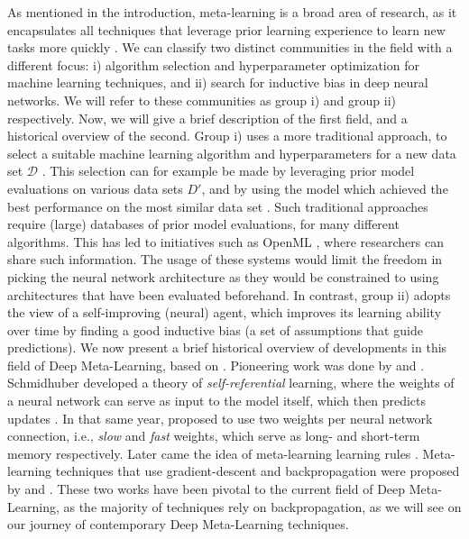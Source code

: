 As mentioned in the introduction, meta-learning is a broad area of research, as it encapsulates all techniques that leverage prior learning experience to learn new tasks more quickly . We can classify two distinct communities in the field with a different focus: i) algorithm selection and hyperparameter optimization for machine learning techniques, and ii) search for inductive bias in deep neural networks. We will refer to these communities as group i) and group ii) respectively. Now, we will give a brief description of the first field, and a historical overview of the second.
Group i) uses a more traditional approach, to select a suitable machine learning algorithm and hyperparameters for a new data set $\mathcal{D}$ . This selection can for example be made by leveraging prior model evaluations on various data sets $D'$, and by using the model which achieved the best performance on the most similar data set . Such traditional approaches require (large) databases of prior model evaluations, for many different algorithms. This has led to initiatives such as OpenML , where researchers can share such information. 
The usage of these systems would limit the freedom in picking the neural network architecture as they would be constrained to using architectures that have been evaluated beforehand.  
In contrast, group ii) adopts the view of a self-improving (neural) agent, which improves its learning ability over time by finding a good inductive bias (a set of assumptions that guide predictions).
We now present a brief historical overview of developments in this field of Deep Meta-Learning, based on . 
Pioneering work was done by  and . Schmidhuber developed a theory of \textit{self-referential} learning, where the weights of a neural network can serve as input to the model itself, which then predicts updates . In that same year,  proposed to use two weights per neural network connection, i.e., \textit{slow} and \textit{fast} weights, which serve as long- and short-term memory respectively. Later came the idea of meta-learning learning rules . Meta-learning techniques that use gradient-descent and backpropagation were proposed by  and . These two works have been pivotal to the current field of Deep Meta-Learning, as the majority of techniques rely on backpropagation, as we will see on our journey of contemporary Deep Meta-Learning techniques.

